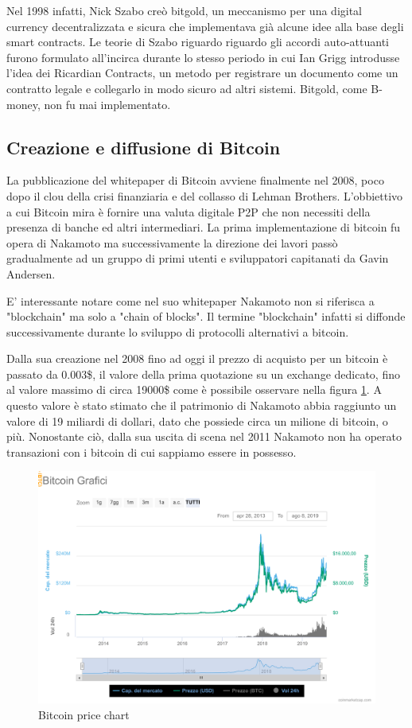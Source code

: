 Nel 1998 infatti, Nick Szabo creò bitgold\cite{K14}, un meccanismo per una digital currency decentralizzata e sicura che implementava già alcune idee alla base degli smart contracts. Le teorie di Szabo riguardo riguardo gli accordi auto-attuanti furono formulato all'incirca durante lo stesso periodo in cui Ian Grigg introdusse l'idea dei Ricardian Contracts, un metodo per registrare un documento come un contratto legale e collegarlo in modo sicuro ad altri sistemi\cite{K15}. Bitgold, come B-money, non fu mai implementato.

\subsection{Creazione e diffusione di Bitcoin}

La pubblicazione del whitepaper di Bitcoin avviene finalmente nel 2008, poco dopo il clou della crisi finanziaria e del collasso di Lehman Brothers. L'obbiettivo a cui Bitcoin mira è fornire una valuta digitale P2P che non necessiti della presenza di banche ed altri intermediari.  La prima implementazione di bitcoin fu opera di Nakamoto ma successivamente la direzione dei lavori passò gradualmente ad un gruppo di primi utenti e sviluppatori capitanati da Gavin Andersen. 

E' interessante notare come nel suo whitepaper\cite{K1} Nakamoto non si riferisca a "blockchain" ma solo a "chain of blocks". Il termine "blockchain" infatti si diffonde successivamente durante lo sviluppo di protocolli alternativi a bitcoin. 

Dalla sua creazione nel 2008 fino ad oggi il prezzo di acquisto per un bitcoin è passato da  0.003\$, il valore della prima quotazione su un exchange dedicato, fino al valore massimo di circa 19000\$ come è possibile osservare nella figura \ref{fig:chartbitcoin}. A questo valore è stato stimato che il patrimonio di Nakamoto abbia raggiunto un valore di 19 miliardi di dollari, dato che possiede circa un milione di bitcoin, o più. Nonostante ciò, dalla sua uscita di scena nel 2011 Nakamoto non ha operato transazioni con i bitcoin di cui sappiamo essere in possesso. 
\begin{figure}[H]
  \includegraphics[width=\linewidth]{chartbitcoin.png}
  \caption{Bitcoin price chart}
  \label{fig:chartbitcoin}
\end{figure}

